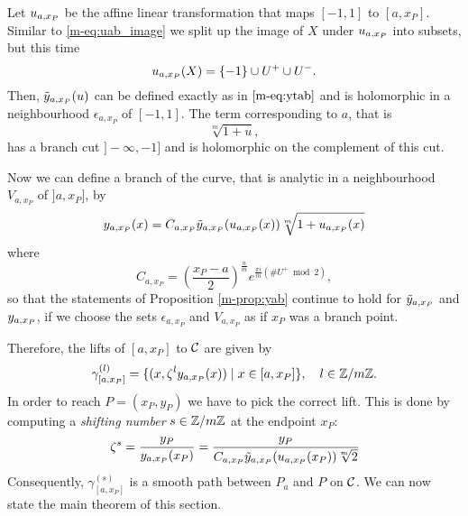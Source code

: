 \documentclass[main.tex]{subfiles}
\begin{document}
  Let  $u_{a,x_P}$ be the affine linear transformation
  that maps $[-1,1]$ to $[a,x_P]$. Similar to \eqref{m-eq:uab_image} we split up the image of $X$ under $u_{a,x_P}$ into subsets, but this time
 \begin{equation*}
  u_{a,x_P}(X) = \{-1\} \cup U^+ \cup U^-.
 \end{equation*}
  Then, $\tilde{y}_{a,x_P}(u)$ can be defined exactly as in $\eqref{m-eq:ytab}$ and
  is holomorphic in a neighbourhood $\epsilon_{a,x_P}$ of $[-1,1]$.
  The term corresponding to $a$, that is
  \begin{equation*}
   \sqrt[m]{1+u},
  \end{equation*}
   has a branch cut $]-\infty,-1]$ and is holomorphic on the complement of this cut.
   
  Now we can define a branch of the curve,
   that is analytic in a neighbourhood $V_{a,x_P}$ of $]a,x_P]$, by
  \begin{equation*}
    y_{a,x_P}(x) =   C_{a,x_P} \tilde{y}_{a,x_P}( u_{a,x_P}(x) ) \sqrt[m]{1 + u_{a,x_P}(x)}
  \end{equation*}
  where 
   \begin{equation*}
      C_{a,x_P} = \left(\frac{x_P-a}{2}\right)^{\frac{n}{m}} e^{\frac{\pi i}{m}(\#U^+ \bmod 2)},
  \end{equation*}
  so that the statements of Proposition \ref{m-prop:yab} continue to hold for $\tilde{y}_{a,x_P}$ and $y_{a,x_P}$, 
  if we choose the sets $\epsilon_{a,x_P}$ and $V_{a,x_P}$ as if $x_P$ was a branch point.
  
  Therefore, the lifts of $[a,x_P]$ to $\mathcal{C}$ are given by
    \begin{equation}\label{eq:def_path_axp}
      \gamma^{(l)}_{[a,x_P]} = \{  (x,\zeta^l y_{a,x_P}(x))  \mid  x \in [a,x_P]  \}, \quad l \in \mathbb{Z}/m\mathbb{Z}.
   \end{equation}
  In order to reach $P = (x_P,y_P)$ we have to pick the correct lift. This is done by computing a \emph{shifting number} $s \in \mathbb{Z}/m\mathbb{Z}$ at the endpoint $x_P$:
  \begin{equation}
      \label{eq:saj}
   \zeta^s = \frac{y_P}{y_{a,x_P}(x_P)} = \frac{y_P}{ C_{a,x_P} \tilde{y}_{a,x_P}( u_{a,x_P}(x_P) ) \sqrt[m]{2}  }
  \end{equation}
  Consequently, $\gamma^{(s)}_{[a,x_P]}$ is a smooth path between $P_a$ and $P$ on $\mathcal{C}$. We can now state the main theorem of this section.
  
\end{document}
